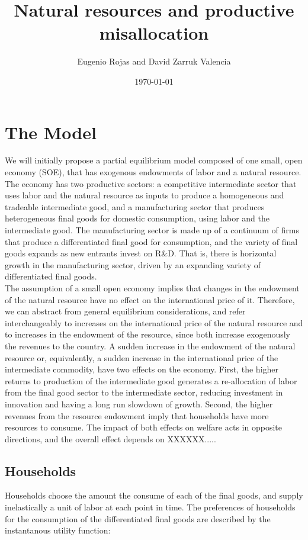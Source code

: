 \documentclass{article}
\title{Natural resources and productive misallocation}
\author{Eugenio Rojas and David Zarruk Valencia}
\date{\today}
\begin{document}
\section{The Model}

We will initially propose a partial equilibrium model composed of one small, open economy (SOE), that has exogenous endowments of labor and a natural resource. The economy has two productive sectors: a competitive intermediate sector that uses labor and the natural resource as inputs to produce a homogeneous and tradeable intermediate good, and a manufacturing sector that produces heterogeneous final goods for domestic consumption, using labor and the intermediate good. The manufacturing sector is made up of a continuum of firms that produce a differentiated final good for consumption, and the variety of final goods expands as new entrants invest on R\&D. That is, there is horizontal growth in the manufacturing sector, driven by an expanding variety of differentiated final goods. \\

The assumption of a small open economy implies that changes in the endowment of the natural resource have no effect on the international price of it. Therefore, we can abstract from general equilibrium considerations, and refer interchangeably to increases on the international price of the natural resource and to increases in the endowment of the resource, since both increase exogenously the revenues to the country. A sudden increase in the endowment of the natural resource or, equivalently, a sudden increase in the international price of the intermediate commodity, have two effects on the economy. First, the higher returns to production of the intermediate good generates a re-allocation of labor from the final good sector to the intermediate sector, reducing investment in innovation and having a long run slowdown of growth. Second, the higher revenues from the resource endowment imply that households have more resources to consume. The impact of both effects on welfare acts in opposite directions, and the overall effect depends on XXXXXX.....

\subsection{Households}

Households choose the amount the consume of each of the final goods, and supply inelastically a unit of labor at each point in time. The preferences of households for the consumption of the differentiated final goods are described by the instantanous utility function:
\end{document}
